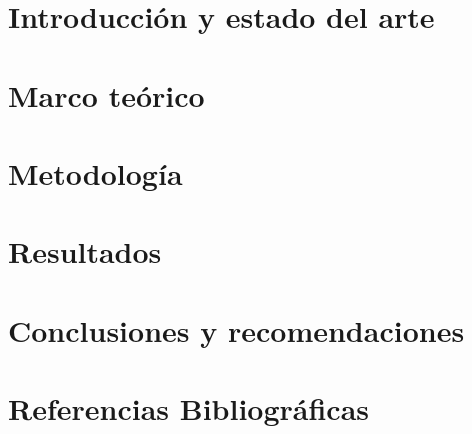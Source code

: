\documentclass[letterpaper, 12pt, journal, oneside, onecolumn]{IEEEtran}
\begin{document}
\section{Introducción y estado del arte}

\newpage

\section{Marco teórico}

\newpage

\section{Metodología}

\newpage

\section{Resultados}

\newpage

\section{Conclusiones y recomendaciones}

\newpage

\section{Referencias Bibliográficas}
\renewcommand\refname{}
\printbibliography
\newpage

%
\end{document}
